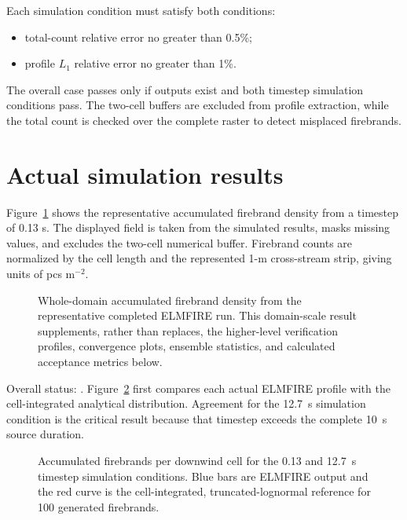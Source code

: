 Each simulation condition must satisfy both conditions:
\begin{itemize}
  \item total-count relative error no greater than 0.5\%;
  \item profile $L_1$ relative error no greater than 1\%.
\end{itemize}
The overall case passes only if outputs exist and both timestep simulation conditions pass.
The two-cell buffers are excluded from profile extraction, while the total
count is checked over the complete raster to detect misplaced firebrands.

\section{Actual simulation results}

Figure~\ref{fig:domain-result} shows the representative accumulated firebrand density from a timestep of 0.13 s.
The displayed field is taken from the simulated results, masks missing values, and excludes
the two-cell numerical buffer.  Firebrand counts are normalized by the cell length and the represented 1-m cross-stream strip, giving units of pcs m$^{-2}$.

\begin{figure}[H]
\centering
{}
\caption{Whole-domain accumulated firebrand density from the representative completed ELMFIRE run.  This
domain-scale result supplements, rather than replaces, the higher-level verification
profiles, convergence plots, ensemble statistics, and calculated acceptance metrics below.}
\label{fig:domain-result}
\end{figure}

Overall status: \textbf{}. Figure~\ref{fig:generation-duration}
first compares each actual ELMFIRE profile with the cell-integrated analytical
distribution. Agreement for the 12.7~s simulation condition is the critical result because
that timestep exceeds the complete 10~s source duration.

\begin{figure}[H]
  \centering
  \caption{Accumulated firebrands per downwind cell for the 0.13 and 12.7~s
  timestep simulation conditions. Blue bars are ELMFIRE output and the red curve is the
  cell-integrated, truncated-lognormal reference for 100 generated firebrands.}
  \label{fig:generation-duration}
\end{figure}

